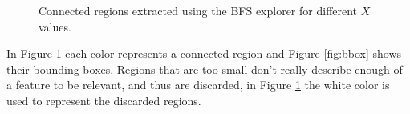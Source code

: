 \documentclass[12pt,a4paper]{article}
\begin{document}
\begin{figure}[!h]
{{		}
		\label{fig:bfs10}
	}
	\quad
	\caption{Connected regions extracted using the BFS explorer for different $X$ values.}
	\label{fig:bfs}
\end{figure}

In Figure \ref{fig:bfs} each color represents a connected region and Figure \ref{fig:bbox} shows their bounding boxes. Regions that are too small don't really describe enough of a feature to be relevant, and thus are discarded, in Figure \ref{fig:bfs} the white color is used to represent the discarded regions. \\
\end{document}
